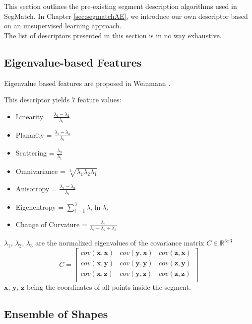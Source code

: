 This section outlines the pre-existing segment description algorithms used in SegMatch. In Chapter \ref{sec:segmatchAE}, we introduce our own descriptor based on an unsupervised learning approach.\\

The list of descriptors presented in this section is in no way exhaustive.\\

\subsection{Eigenvalue-based Features}
\label{subsec:eigenvalues}

Eigenvalue based features are proposed in Weinmann \cite{weinmann2014semantic}.

This descriptor yields 7 feature values:

\begin{itemize}
  \item{Linearity = $\frac{\lambda_1 - \lambda_2}{\lambda_1}$}
  \item{Planarity = $\frac{\lambda_2 - \lambda_3}{\lambda_1}$}
  \item{Scattering = $\frac{\lambda_3}{\lambda_1}$}
  \item{Omnivariance = $\sqrt[3]{\lambda_1 \lambda_2 \lambda_1}$}
  \item{Anisotropy = $\frac{\lambda_1 - \lambda_3}{\lambda_1}$}
  \item{Eigenentropy = $\sum\limits_{i=1}^3 \lambda_i \ln{\lambda_i}$}
  \item{Change of Curvature = $\frac{\lambda_3}{\lambda_1 + \lambda_2 + \lambda_3}$}
\end{itemize}

$\lambda_1$, $\lambda_2$, $\lambda_3$ are the normalized eigenvalues of the covariance matrix $C \in \mathbb{R}^{3x3}$
$$
C = 
\begin{bmatrix}
  cov(\textbf{x},\textbf{x}) & cov(\textbf{y},\textbf{x}) & cov(\textbf{z},\textbf{x})  \\
  cov(\textbf{x},\textbf{y}) & cov(\textbf{y},\textbf{y}) & cov(\textbf{z},\textbf{y})  \\
  cov(\textbf{x},\textbf{z}) & cov(\textbf{y},\textbf{z}) & cov(\textbf{z},\textbf{z})  \\
\end{bmatrix} 
$$
$\textbf{x}$, $\textbf{y}$, $\textbf{z}$ being the coordinates of all points inside the segment.

\subsection{Ensemble of Shapes}
\label{subsec:ensemble-of-shapes}

